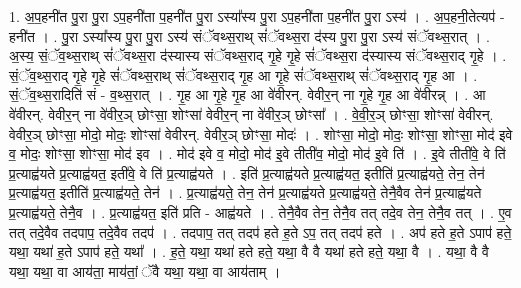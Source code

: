 \documentclass[17pt]{extarticle}
\begin{document}
1. अ॒प॒हनी॑त पु॒रा पु॒रा ऽप॒हनी॑ता प॒हनी॑त पु॒रा ऽस्या᳚स्य पु॒रा ऽप॒हनी॑ता प॒हनी॑त पु॒रा ऽस्य॑ । . अ॒प॒हनी॒तेत्यप॑ - हनी॑त । . पु॒रा ऽस्या᳚स्य पु॒रा पु॒रा ऽस्य॑ संॅवथ्स॒राथ् सं॑ॅवथ्स॒रा द॑स्य पु॒रा पु॒रा ऽस्य॑ संॅवथ्स॒रात् । . अ॒स्य॒ सं॒ॅव॒थ्स॒राथ् सं॑ॅवथ्स॒रा द॑स्यास्य संॅवथ्स॒राद् गृ॒हे गृ॒हे सं॑ॅवथ्स॒रा द॑स्यास्य संॅवथ्स॒राद् गृ॒हे । . सं॒ॅव॒थ्स॒राद् गृ॒हे गृ॒हे सं॑ॅवथ्स॒राथ् सं॑ॅवथ्स॒राद् गृ॒ह आ गृ॒हे सं॑ॅवथ्स॒राथ् सं॑ॅवथ्स॒राद् गृ॒ह आ । . सं॒ॅव॒थ्स॒रादिति॑ सं - व॒थ्स॒रात् । . गृ॒ह आ गृ॒हे गृ॒ह आ वे॑वीरन्. वेवीर॒न् ना गृ॒हे गृ॒ह आ वे॑वीरन्न् । . आ वे॑वीरन्. वेवीर॒न् ना वे॑वीर॒ञ् छोꣳसा॒ शोꣳसा॑ वेवीर॒न् ना वे॑वीर॒ञ् छोꣳसा᳚ । . वे॒वी॒र॒ञ् छोꣳसा॒ शोꣳसा॑ वेवीरन्. वेवीर॒ञ् छोꣳसा॒ मोदो॒ मोदः॒ शोꣳसा॑ वेवीरन्. वेवीर॒ञ् छोꣳसा॒ मोदः॑ । . शोꣳसा॒ मोदो॒ मोदः॒ शोꣳसा॒ शोꣳसा॒ मोद॑ इवे व॒ मोदः॒ शोꣳसा॒ शोꣳसा॒ मोद॑ इव । . मोद॑ इवे व॒ मोदो॒ मोद॑ इ॒वे तीती॑व॒ मोदो॒ मोद॑ इ॒वे ति॑ । . इ॒वे तीती॑वे॒ वे ति॑ प्र॒त्याह्व॑यते प्र॒त्याह्व॑यत॒ इती॑वे॒ वे ति॑ प्र॒त्याह्व॑यते । . इति॑ प्र॒त्याह्व॑यते प्र॒त्याह्व॑यत॒ इतीति॑ प्र॒त्याह्व॑यते॒ तेन॒ तेन॑ प्र॒त्याह्व॑यत॒ इतीति॑ प्र॒त्याह्व॑यते॒ तेन॑ । . प्र॒त्याह्व॑यते॒ तेन॒ तेन॑ प्र॒त्याह्व॑यते प्र॒त्याह्व॑यते॒ तेनै॒वैव तेन॑ प्र॒त्याह्व॑यते प्र॒त्याह्व॑यते॒ तेनै॒व । . प्र॒त्याह्व॑यत॒ इति॑ प्रति - आह्व॑यते । . तेनै॒वैव तेन॒ तेनै॒व तत् तदे॒व तेन॒ तेनै॒व तत् । . ए॒व तत् तदे॒वैव तदपाप॒ तदे॒वैव तदप॑ । . तदपाप॒ तत् तदप॑ हते ह॒ते ऽप॒ तत् तदप॑ हते । . अप॑ हते ह॒ते ऽपाप॑ हते॒ यथा॒ यथा॑ ह॒ते ऽपाप॑ हते॒ यथा᳚ । . ह॒ते॒ यथा॒ यथा॑ हते हते॒ यथा॒ वै वै यथा॑ हते हते॒ यथा॒ वै । . यथा॒ वै वै यथा॒ यथा॒ वा आय॑ता॒ माय॑तां॒ ॅवै यथा॒ यथा॒ वा आय॑ताम् । \newline
\end{document}
